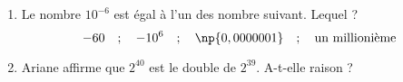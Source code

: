 
\begin{enumerate}
\item Le nombre $10^{-6}$ est égal à l'un des nombre suivant. Lequel ?
$$ -60 \quad ;  \quad -10^6 \quad ; \quad \np{0,000 0001}  \quad ; \quad \text{un millionième}$$

\item Ariane affirme que $2^{40}$ est le double de $2^{39}$. A-t-elle raison ?
\end{enumerate}

